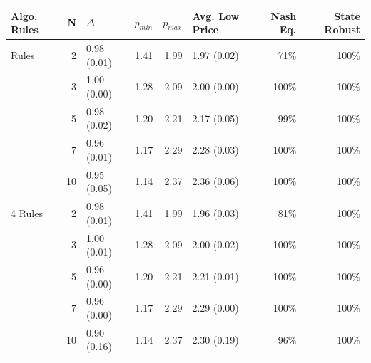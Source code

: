 \fontsize{12.0pt}{14.4pt}\selectfont

\begin{tabular*}{\linewidth}{@{\extracolsep{\fill}}lrlrrlrr}
\toprule
Algo. Rules & N & $\Delta$ & $p_{min}$ & $p_{max}$ & Avg. Low Price & Nash Eq. & State Robust \\ 
\midrule\addlinespace[2.5pt]
3 Rules & 2 & 0.98
(0.01) & 1.41 & 1.99 & 1.97
(0.02) & 71\% & 100\% \\
 & 3 & 1.00
(0.00) & 1.28 & 2.09 & 2.00
(0.00) & 100\% & 100\% \\
 & 5 & 0.98
(0.02) & 1.20 & 2.21 & 2.17
(0.05) & 99\% & 100\% \\
 & 7 & 0.96
(0.01) & 1.17 & 2.29 & 2.28
(0.03) & 100\% & 100\% \\
 & 10 & 0.95
(0.05) & 1.14 & 2.37 & 2.36
(0.06) & 100\% & 100\% \\
4 Rules & 2 & 0.98
(0.01) & 1.41 & 1.99 & 1.96
(0.03) & 81\% & 100\% \\
 & 3 & 1.00
(0.01) & 1.28 & 2.09 & 2.00
(0.02) & 100\% & 100\% \\
 & 5 & 0.96
(0.00) & 1.20 & 2.21 & 2.21
(0.01) & 100\% & 100\% \\
 & 7 & 0.96
(0.00) & 1.17 & 2.29 & 2.29
(0.00) & 100\% & 100\% \\
 & 10 & 0.90
(0.16) & 1.14 & 2.37 & 2.30
(0.19) & 96\% & 100\% \\
\bottomrule
\end{tabular*}
